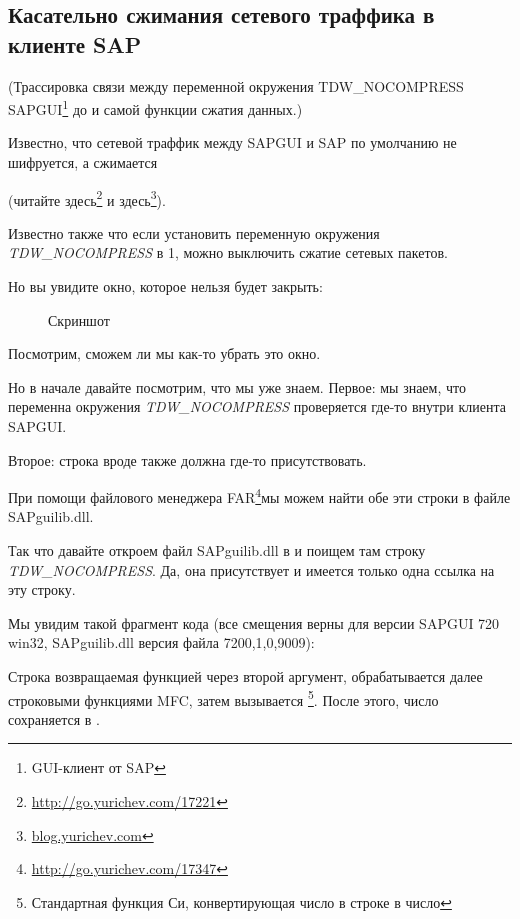 \subsection{Касательно сжимания сетевого траффика в клиенте SAP}
\label{sec:SAPGUI}

\newcommand{\TDWNC}{TDW\_NOCOMPRESS\xspace}

(Трассировка связи между переменной окружения \TDWNC{} SAPGUI\footnote{GUI-клиент от SAP}
до  и самой функции сжатия данных.)

Известно, что сетевой траффик между SAPGUI и SAP по умолчанию не шифруется, а сжимается 

(читайте здесь\footnote{\url{http://go.yurichev.com/17221}} 
и здесь\footnote{\href{http://go.yurichev.com/17225}{blog.yurichev.com}}). 

Известно также что если установить переменную окружения \emph{\TDWNC} в 1, можно выключить сжатие сетевых пакетов.

Но вы увидите окно, которое нельзя будет закрыть:

\begin{figure}[H]
\centering
{}
\caption{Скриншот}
\end{figure}

Посмотрим, сможем ли мы как-то убрать это окно.

Но в начале давайте посмотрим, что мы уже знаем.
Первое: мы знаем, что переменна окружения \emph{\TDWNC} проверяется где-то внутри клиента SAPGUI.

Второе: строка вроде  также должна где-то присутствовать.

\newcommand{\FNURLFAR}{\footnote{\url{http://go.yurichev.com/17347}}}
При помощи файлового менеджера FAR\FNURLFAR мы можем найти обе эти строки в файле SAPguilib.dll.

Так что давайте откроем файл SAPguilib.dll в \IDA и поищем там строку \emph{\TDWNC}.
Да, она присутствует и имеется только одна ссылка на эту строку.

Мы увидим такой фрагмент кода
(все смещения верны для версии SAPGUI 720 win32, SAPguilib.dll версия файла 7200,1,0,9009):



Строка возвращаемая функцией  через второй аргумент, обрабатывается далее строковыми
функциями MFC, затем вызывается \footnote{Стандартная функция Си, конвертирующая число в строке в число}.
После этого, число сохраняется в .

